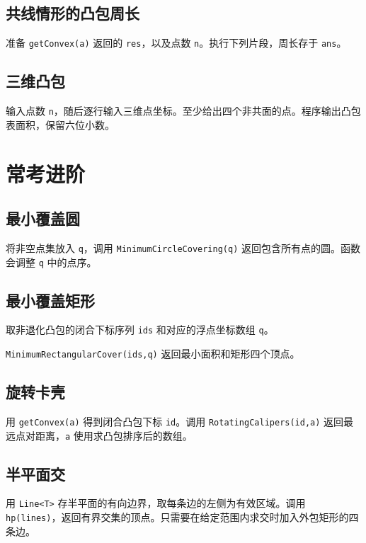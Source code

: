 
\subsection{共线情形的凸包周长}

准备 \texttt{getConvex(a)} 返回的 \texttt{res}，以及点数 \texttt{n}。执行下列片段，周长存于 \texttt{ans}。


\subsection{三维凸包}

输入点数 \texttt{n}，随后逐行输入三维点坐标。至少给出四个非共面的点。程序输出凸包表面积，保留六位小数。


\section{常考进阶}

\subsection{最小覆盖圆}

将非空点集放入 \texttt{q}，调用 \texttt{MinimumCircleCovering(q)} 返回包含所有点的圆。函数会调整 \texttt{q} 中的点序。


\subsection{最小覆盖矩形}

取非退化凸包的闭合下标序列 \texttt{ids} 和对应的浮点坐标数组 \texttt{q}。

\texttt{MinimumRectangularCover(ids,q)} 返回最小面积和矩形四个顶点。


\subsection{旋转卡壳}

用 \texttt{getConvex(a)} 得到闭合凸包下标 \texttt{id}。调用 \texttt{RotatingCalipers(id,a)} 返回最远点对距离，\texttt{a} 使用求凸包排序后的数组。


\subsection{半平面交}

用 \texttt{Line<T>} 存半平面的有向边界，取每条边的左侧为有效区域。调用 \texttt{hp(lines)}，返回有界交集的顶点。只需要在给定范围内求交时加入外包矩形的四条边。

